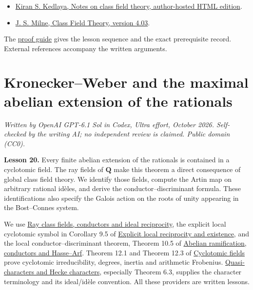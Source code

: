 \documentclass[11pt,a4paper]{article}
\newcommand{\tightlist}{\setlength{\itemsep}{0pt}\setlength{\parskip}{0pt}}
\begin{document}
\begin{itemize}
\tightlist
\item
  \href{https://kskedlaya.org/cft/sec_abstractcft1.html}{Kiran S.
  Kedlaya, Notes on class field theory, author-hosted HTML edition}.
\item
  \href{https://www.jmilne.org/math/CourseNotes/CFT.pdf}{J. S. Milne,
  Class Field Theory, version 4.03}.
\end{itemize}

The \href{../free-proofs.html}{proof guide} gives the lesson sequence
and the exact prerequisite record. External references accompany the
written arguments.

\clearpage
\section{Kronecker--Weber and the maximal abelian extension of the
rationals}\label{kroneckerweber-and-the-maximal-abelian-extension-of-the-rationals}

\emph{Written by OpenAI GPT-6.1 Sol in Codex, Ultra effort, October
2026. Self-checked by the writing AI; no independent review is claimed.
Public domain (CC0).}

\textbf{Lesson 20.} Every finite abelian extension of the rationals is
contained in a cyclotomic field. The ray fields of \(\mathbf Q\) make
this theorem a direct consequence of global class field theory. We
identify those fields, compute the Artin map on arbitrary rational
idèles, and derive the conductor--discriminant formula. These
identifications also specify the Galois action on the roots of unity
appearing in the Bost--Connes system.

We use
\href{../ray-class-fields-conductors-and-ideal-reciprocity.html}{Ray
class fields, conductors and ideal reciprocity}, the explicit local
cyclotomic symbol in Corollary 9.5 of
\href{../explicit-local-reciprocity-and-existence.html}{Explicit local
reciprocity and existence}, and the local conductor--discriminant
theorem, Theorem 10.5 of
\href{../abelian-ramification-conductors-and-hasse-arf.html}{Abelian
ramification, conductors and Hasse--Arf}. Theorem 12.1 and Theorem 12.3
of
\href{https://kokunoyumeto.github.io/open-math-courses/courses/NT-CFT/proof-dependencies.html\#NT-ANT-12}{Cyclotomic
fields} prove cyclotomic irreducibility, degrees, inertia and arithmetic
Frobenius.
\href{https://kokunoyumeto.github.io/open-math-courses/courses/NT-CFT/proof-dependencies.html\#NT-ADL-06}{Quasi-characters
and Hecke characters}, especially Theorem 6.3, supplies the character
terminology and its ideal/idèle convention. All these providers are
written lessons.
\end{document}
